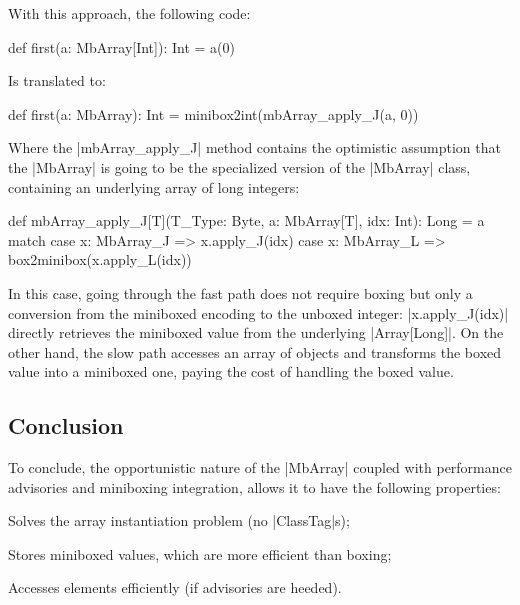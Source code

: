 With this approach, the following code:

\begin{lstlisting-nobreak}
 def first(a: MbArray[Int]): Int = a(0)
\end{lstlisting-nobreak}

Is translated to:

\begin{lstlisting-nobreak}
 def first(a: MbArray): Int =
   minibox2int(mbArray_apply_J(a, 0))
\end{lstlisting-nobreak}

Where the |mbArray_apply_J| method contains the optimistic assumption that the |MbArray| is going to be the specialized version of the |MbArray| class, containing an underlying array of long integers:

\begin{lstlisting-nobreak}
 def mbArray_apply_J[T](T_Type: Byte, a: MbArray[T], idx: Int): Long =
   a match {
     case x: MbArray_J => x.apply_J(idx)
     case x: MbArray_L => box2minibox(x.apply_L(idx))
   }
\end{lstlisting-nobreak}

In this case, going through the fast path does not require boxing but only a conversion from the miniboxed encoding to the unboxed integer: |x.apply_J(idx)| directly retrieves the miniboxed value from the underlying |Array[Long]|. On the other hand, the slow path accesses an array of objects and transforms the boxed value into a miniboxed one, paying the cost of handling the boxed value.

\subsection{Conclusion}


To conclude, the opportunistic nature of the |MbArray| coupled with performance advisories and miniboxing integration, allows it to have the following properties:
\begin{compactitem}
  \item Solves the array instantiation problem (no |ClassTag|s);
  \item Stores miniboxed values, which are more efficient than boxing;
  \item Accesses elements efficiently (if advisories are heeded).
\end{compactitem}

